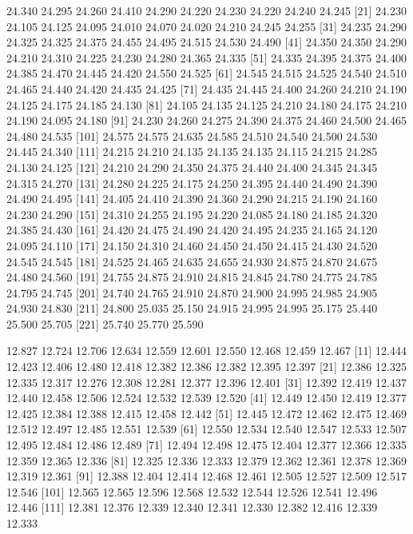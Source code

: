 \documentclass[a4paper,11pt]{scrartcl}
\begin{document}
\begin{Schunk}
\begin{Soutput}
 [11] 24.340 24.295 24.260 24.410 24.290 24.220 24.230 24.220 24.240 24.245
 [21] 24.230 24.105 24.125 24.095 24.010 24.070 24.020 24.210 24.245 24.255
 [31] 24.235 24.290 24.325 24.325 24.375 24.455 24.495 24.515 24.530 24.490
 [41] 24.350 24.350 24.290 24.210 24.310 24.225 24.230 24.280 24.365 24.335
 [51] 24.335 24.395 24.375 24.400 24.385 24.470 24.445 24.420 24.550 24.525
 [61] 24.545 24.515 24.525 24.540 24.510 24.465 24.440 24.420 24.435 24.425
 [71] 24.435 24.445 24.400 24.260 24.210 24.190 24.125 24.175 24.185 24.130
 [81] 24.105 24.135 24.125 24.210 24.180 24.175 24.210 24.190 24.095 24.180
 [91] 24.230 24.260 24.275 24.390 24.375 24.460 24.500 24.465 24.480 24.535
[101] 24.575 24.575 24.635 24.585 24.510 24.540 24.500 24.530 24.445 24.340
[111] 24.215 24.210 24.135 24.135 24.135 24.115 24.215 24.285 24.130 24.125
[121] 24.210 24.290 24.350 24.375 24.440 24.400 24.345 24.345 24.315 24.270
[131] 24.280 24.225 24.175 24.250 24.395 24.440 24.490 24.390 24.490 24.495
[141] 24.405 24.410 24.390 24.360 24.290 24.215 24.190 24.160 24.230 24.290
[151] 24.310 24.255 24.195 24.220 24.085 24.180 24.185 24.320 24.385 24.430
[161] 24.420 24.475 24.490 24.420 24.495 24.235 24.165 24.120 24.095 24.110
[171] 24.150 24.310 24.460 24.450 24.450 24.415 24.430 24.520 24.545 24.545
[181] 24.525 24.465 24.635 24.655 24.930 24.875 24.870 24.675 24.480 24.560
[191] 24.755 24.875 24.910 24.815 24.845 24.780 24.775 24.785 24.795 24.745
[201] 24.740 24.765 24.910 24.870 24.900 24.995 24.985 24.905 24.930 24.830
[211] 24.800 25.035 25.150 24.915 24.995 24.995 25.175 25.440 25.500 25.705
[221] 25.740 25.770 25.590
\end{Soutput}
\begin{Soutput}
  [1] 12.827 12.724 12.706 12.634 12.559 12.601 12.550 12.468 12.459 12.467
 [11] 12.444 12.423 12.406 12.480 12.418 12.382 12.386 12.382 12.395 12.397
 [21] 12.386 12.325 12.335 12.317 12.276 12.308 12.281 12.377 12.396 12.401
 [31] 12.392 12.419 12.437 12.440 12.458 12.506 12.524 12.532 12.539 12.520
 [41] 12.449 12.450 12.419 12.377 12.425 12.384 12.388 12.415 12.458 12.442
 [51] 12.445 12.472 12.462 12.475 12.469 12.512 12.497 12.485 12.551 12.539
 [61] 12.550 12.534 12.540 12.547 12.533 12.507 12.495 12.484 12.486 12.489
 [71] 12.494 12.498 12.475 12.404 12.377 12.366 12.335 12.359 12.365 12.336
 [81] 12.325 12.336 12.333 12.379 12.362 12.361 12.378 12.369 12.319 12.361
 [91] 12.388 12.404 12.414 12.468 12.461 12.505 12.527 12.509 12.517 12.546
[101] 12.565 12.565 12.596 12.568 12.532 12.544 12.526 12.541 12.496 12.446
[111] 12.381 12.376 12.339 12.340 12.341 12.330 12.382 12.416 12.339 12.333

\end{Soutput}
\end{Schunk}
\end{document}
